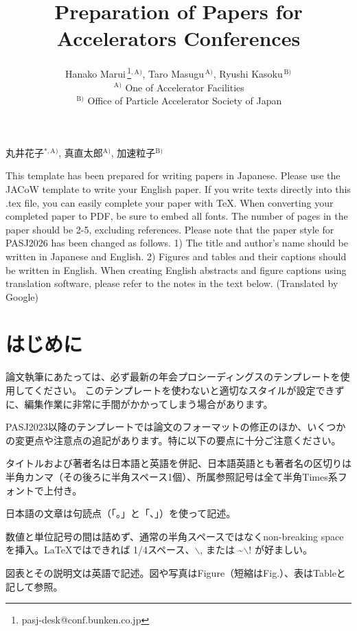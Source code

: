 \documentclass{PASJ2026}
\newcommand{\jaffi}[1]{$^{\mathrm{#1)}}$}
\newcommand{\affi}[1]{$^{\,\mathrm{#1)}}$}
\newcommand{\affithanks}[2]{\,\thanks{#1}\!$^{,\mathrm{#2)}}$}
\begin{document}
%
%
\title{Preparation of Papers for Accelerators Conferences}
%
\jauthor
{
丸井花子\jaffi{*, A},
真直太郎\jaffi{A},
加速粒子\jaffi{B}
}
%
\author
{
Hanako Marui\affithanks{pasj-desk@conf.bunken.co.jp}{A},
Taro Masugu\affi{A},
Ryushi Kasoku\affi{B}\\
\affi{A} One of Accelerator Facilities\\
\affi{B} Office of Particle Accelerator Society of Japan\\
}
%
\Abstract
{
This template has been prepared for writing papers in Japanese. Please use the JACoW template to write your English paper. If you write texts directly into this .tex file, you can easily complete your paper with \TeX. When converting your completed paper to PDF, be sure to embed all fonts. The number of pages in the paper should be 2-5, excluding references. Please note that the paper style for PASJ2026 has been changed as follows. 1) The title and author's name should be written in Japanese and English. 2) Figures and tables and their captions should be written in English. When creating English abstracts and figure captions using translation software, please refer to the notes in the text below. (Translated by Google)
}
%
\maketitle
%
\section{はじめに}
論文執筆にあたっては、必ず最新の年会プロシーディングスのテンプレートを使用してください。%
このテンプレートを使わないと適切なスタイルが設定できずに、編集作業に非常に手間がかかってしまう場合があります。

PASJ2023以降のテンプレートでは論文のフォーマットの修正のほか、いくつかの変更点や注意点の追記があります。特に以下の要点に十分ご注意ください。
%
\begin{Itemize}
\item{タイトルおよび著者名は日本語と英語を併記、日本語英語とも著者名の区切りは半角カンマ（その後ろに半角スペース1個）、所属参照記号は全て半角Times系フォントで上付き。} 
%
\item{日本語の文章は句読点（「。」と「、」）を使って記述。}

%
\item{数値と単位記号の間は詰めず、通常の半角スペースではなくnon-breaking spaceを挿入。\LaTeX ではできれば 1/4スペース、$\backslash${,} または \textasciitilde$\backslash${!} が好ましい。}
%
\item{図表とその説明文は英語で記述。図や写真はFigure（短縮はFig.）、表はTableと記して参照。}
%
\end{Itemize}
\end{document}
